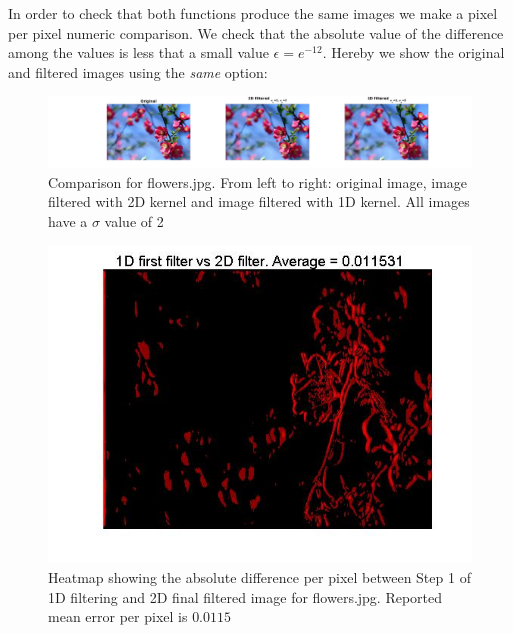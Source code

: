 \documentclass[11pt]{article}
\begin{document}
In order to check that both functions produce the same images we make a pixel
per pixel numeric comparison. We check that the absolute value of the difference
among the values is less that a small value $\epsilon = e^{-12}$. Hereby we show
the original and filtered images using the \emph{same} option:

\begin{figure}[H] \centering
	\includegraphics[width=1\textwidth]{imgs/flowers_conv.jpg}
	\caption{Comparison for flowers.jpg. From left to right: original image, image
	filtered with 2D kernel and image filtered with 1D kernel. All images have a
	$\sigma$ value of 2}
	\label{fig:flowers}
\end{figure}

\begin{figure}[H] \centering
	\includegraphics[width=.9\textwidth]{imgs/flowers_col_heatmap.jpg}
	\caption{Heatmap showing the absolute difference per pixel between Step
		1 of 1D filtering and 2D final filtered image for flowers.jpg. Reported
		mean error per pixel is $0.0115$}
	\label{fig:flowers_col_heatmap}
\end{figure}
\end{document}
